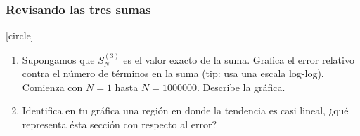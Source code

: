 \begin{frame}
\frametitle{Revisando las tres sumas}
[circle]
\begin{enumerate}[<+->]
\conti
\item Supongamos que $S^{(3)}_{N}$ es el valor exacto de la suma. Grafica el error relativo contra el número de términos en la suma (tip: usa una escala log-log). Comienza con $N = 1$ hasta $N = 1000000$. Describe la gráfica.
\item Identifica en tu gráfica una región en donde la tendencia es casi lineal, ¿qué representa ésta sección con respecto al error?
\end{enumerate}
\end{frame}
